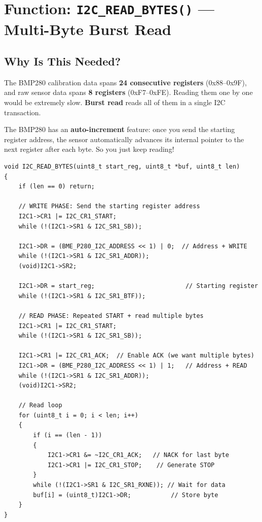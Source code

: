\documentclass[12pt, a4paper]{article}
\begin{document}
\section{Function: \texttt{I2C\_READ\_BYTES()} --- Multi-Byte Burst Read}

\subsection{Why Is This Needed?}

The BMP280 calibration data spans \textbf{24 consecutive registers} (0x88--0x9F), and raw sensor data spans \textbf{8 registers} (0xF7--0xFE). Reading them one by one would be extremely slow. \textbf{Burst read} reads all of them in a single I2C transaction.

\begin{tipbox}
The BMP280 has an \textbf{auto-increment} feature: once you send the starting register address, the sensor automatically advances its internal pointer to the next register after each byte. So you just keep reading!
\end{tipbox}

\begin{codebox}
\begin{lstlisting}[style=CStyle]
void I2C_READ_BYTES(uint8_t start_reg, uint8_t *buf, uint8_t len)
{
    if (len == 0) return;

    // WRITE PHASE: Send the starting register address
    I2C1->CR1 |= I2C_CR1_START;
    while (!(I2C1->SR1 & I2C_SR1_SB));

    I2C1->DR = (BME_P280_I2C_ADDRESS << 1) | 0;  // Address + WRITE
    while (!(I2C1->SR1 & I2C_SR1_ADDR));
    (void)I2C1->SR2;

    I2C1->DR = start_reg;                         // Starting register
    while (!(I2C1->SR1 & I2C_SR1_BTF));

    // READ PHASE: Repeated START + read multiple bytes
    I2C1->CR1 |= I2C_CR1_START;
    while (!(I2C1->SR1 & I2C_SR1_SB));

    I2C1->CR1 |= I2C_CR1_ACK;  // Enable ACK (we want multiple bytes)
    I2C1->DR = (BME_P280_I2C_ADDRESS << 1) | 1;   // Address + READ
    while (!(I2C1->SR1 & I2C_SR1_ADDR));
    (void)I2C1->SR2;

    // Read loop
    for (uint8_t i = 0; i < len; i++)
    {
        if (i == (len - 1))
        {
            I2C1->CR1 &= ~I2C_CR1_ACK;   // NACK for last byte
            I2C1->CR1 |= I2C_CR1_STOP;    // Generate STOP
        }
        while (!(I2C1->SR1 & I2C_SR1_RXNE)); // Wait for data
        buf[i] = (uint8_t)I2C1->DR;           // Store byte
    }
}
\end{lstlisting}
\end{codebox}
\end{document}
